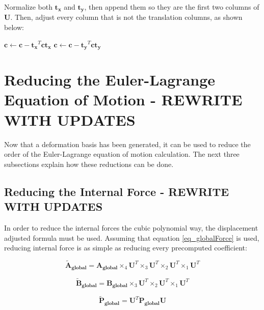 \documentclass[twocolumn,10pt]{asme2ej}
\begin{document}
Normalize both $\bm{t_x}$ and $\bm{t_y}$, then append them so they are the first two columns of $\bm{U}$. Then, adjust every column that is not the translation columns, as shown below:

\bigskip
\begin{algorithmic}[1]
          \State $ \bm{c} \gets \bm{c} -  \bm{t_x}^T \bm{c} \bm{t_x}$
          \State $ \bm{c} \gets \bm{c} -  \bm{t_y}^T \bm{c} \bm{t_y}$
          \EndIf
        \EndFor
    \EndFunction
\end{algorithmic}

\section{Reducing the Euler-Lagrange Equation of Motion - REWRITE WITH UPDATES}

Now that a deformation basis has been generated, it can be used to reduce the order of the Euler-Lagrange equation of motion calculation. The next three subsections explain how these reductions can be done.

\subsection{Reducing the Internal Force - REWRITE WITH UPDATES}

In order to reduce the internal forces the cubic polynomial way, the displacement adjusted formula must be used. Assuming that equation \ref{eq_globalForce} is used, reducing internal force is as simple as reducing every precomputed coefficient:

\begin{equation}
  \bm{\tilde{A}_{global}} = \bm{A_{global}} \times_4 \bm{U}^T  \times_3 \bm{U}^T  \times_2 \bm{U}^T  \times_1 \bm{U}^T
\end{equation}

\begin{equation}
  \bm{\tilde{B}_{global}} = \bm{B_{global}} \times_3 \bm{U}^T  \times_2 \bm{U}^T  \times_1 \bm{U}^T
\end{equation}

\begin{equation}
  \bm{\tilde{P}_{global}} = \bm{U}^T \bm{P_{global}} \bm{U}
\end{equation}
\end{document}
